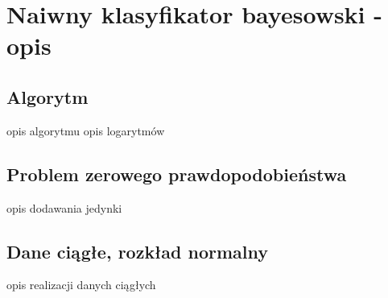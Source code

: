 \chapter{Naiwny klasyfikator bayesowski - opis}
	\section{Algorytm}
opis algorytmu
opis logarytmów
	\section{Problem zerowego prawdopodobieństwa}
opis dodawania jedynki
	\section{Dane ciągłe, rozkład normalny}
opis realizacji danych ciągłych
